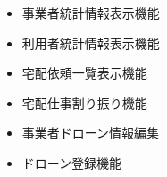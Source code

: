 \documentclass[a4paper, titlepage]{jsarticle}
\begin{document}
\begin{itemize}[labelwidth=\linewidth]
  \item 事業者統計情報表示機能 %
  
  \item 利用者統計情報表示機能 %
  
  \item 宅配依頼一覧表示機能 %
  
  \item 宅配仕事割り振り機能 %
  \item 事業者ドローン情報編集 %
  \item ドローン登録機能 %
\end{itemize}
\end{document}
